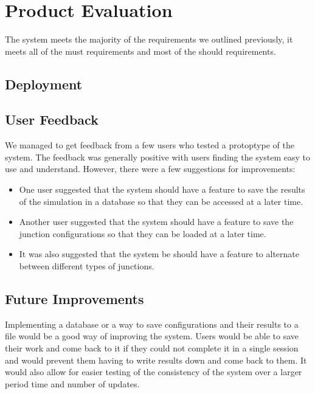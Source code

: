 \documentclass{article}
\begin{document}
    \section{Product Evaluation}

    The system meets the majority of the requirements we outlined previously, it meets all of the must requirements and
    most of the should requirements.

    \subsection{Deployment}

    \subsection{User Feedback}

    We managed to get feedback from a few users who tested a protoptype of the system. The feedback was generally positive with users finding the system easy to use and understand. However, there were a few suggestions for improvements:

    \begin{itemize}
        \item One user suggested that the system should have a feature to save the results of the simulation in a database so that they can be accessed at a later time.
        \item Another user suggested that the system should have a feature to save the junction configurations so that they can be loaded at a later time.
        \item It was also suggested that the system be should have a feature to alternate between different types of junctions.
    \end{itemize}

    \subsection{Future Improvements}

    Implementing a database or a way to save configurations and their results to a file would be a good way of improving
    the system. Users would be able to save their work and come back to it if they could not complete it in a single
    session and would prevent them having to write results down and come back to them. It would also allow for easier
    testing of the consistency of the system over a larger period time and number of updates.
\end{document}
